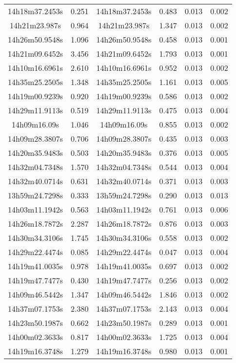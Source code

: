 \begin{table}
\begin{tabular}{cccccc}
14h18m37.2453s & 0.251 & 14h18m37.2453s & 0.483 & 0.013 & 0.002 \\
14h21m23.987s & 0.964 & 14h21m23.987s & 1.347 & 0.013 & 0.002 \\
14h26m50.9548s & 1.096 & 14h26m50.9548s & 0.458 & 0.013 & 0.001 \\
14h21m09.6452s & 3.456 & 14h21m09.6452s & 1.793 & 0.013 & 0.001 \\
14h10m16.6961s & 2.610 & 14h10m16.6961s & 0.952 & 0.013 & 0.002 \\
14h35m25.2505s & 1.348 & 14h35m25.2505s & 1.161 & 0.013 & 0.005 \\
14h19m00.9239s & 0.920 & 14h19m00.9239s & 0.586 & 0.013 & 0.002 \\
14h29m11.9113s & 0.519 & 14h29m11.9113s & 0.475 & 0.013 & 0.004 \\
14h09m16.09s & 1.046 & 14h09m16.09s & 0.855 & 0.013 & 0.002 \\
14h09m28.3807s & 0.706 & 14h09m28.3807s & 0.435 & 0.013 & 0.003 \\
14h20m35.9483s & 0.503 & 14h20m35.9483s & 0.376 & 0.013 & 0.005 \\
14h32m04.7348s & 1.570 & 14h32m04.7348s & 0.544 & 0.013 & 0.004 \\
14h32m40.0714s & 0.631 & 14h32m40.0714s & 0.371 & 0.013 & 0.003 \\
13h59m24.7298s & 0.333 & 13h59m24.7298s & 0.290 & 0.013 & 0.013 \\
14h03m11.1942s & 0.563 & 14h03m11.1942s & 0.761 & 0.013 & 0.006 \\
14h26m18.7872s & 2.287 & 14h26m18.7872s & 0.876 & 0.013 & 0.003 \\
14h30m34.3106s & 1.745 & 14h30m34.3106s & 0.558 & 0.013 & 0.002 \\
14h29m22.4474s & 0.085 & 14h29m22.4474s & 0.047 & 0.013 & 0.004 \\
14h19m41.0035s & 0.978 & 14h19m41.0035s & 0.697 & 0.013 & 0.002 \\
14h19m47.7477s & 0.430 & 14h19m47.7477s & 0.256 & 0.013 & 0.002 \\
14h09m46.5442s & 1.347 & 14h09m46.5442s & 1.846 & 0.013 & 0.002 \\
14h37m07.1753s & 2.380 & 14h37m07.1753s & 2.143 & 0.013 & 0.004 \\
14h23m50.1987s & 0.662 & 14h23m50.1987s & 0.289 & 0.013 & 0.001 \\
14h00m02.3633s & 0.817 & 14h00m02.3633s & 1.725 & 0.013 & 0.004 \\
14h19m16.3748s & 1.279 & 14h19m16.3748s & 0.980 & 0.013 & 0.001 \\

\end{tabular}
\end{table}
